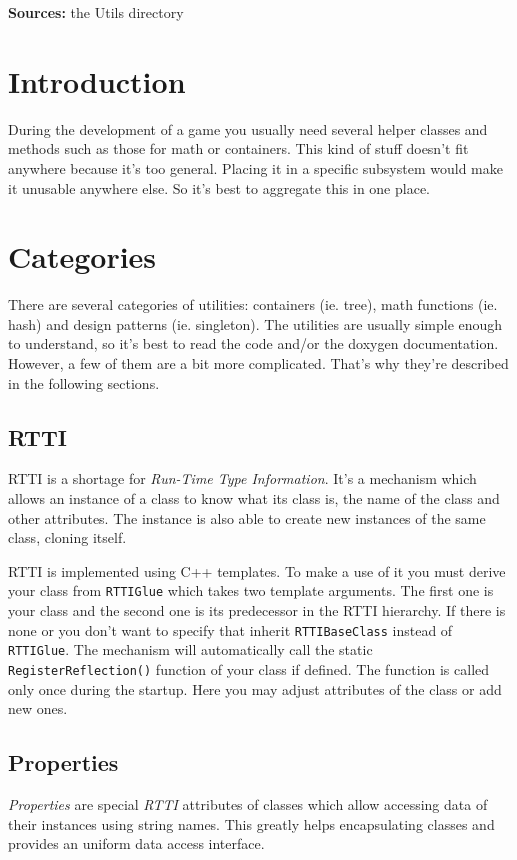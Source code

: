 \noindent\textbf{Sources:} the Utils directory


\section{Introduction}
During the development of a game you usually need several helper classes and methods such as those for math or containers. This kind of stuff doesn't fit anywhere because it's too general. Placing it in a specific subsystem would make it unusable anywhere else. So it's best to aggregate this in one place.



\section{Categories}
There are several categories of utilities: containers (ie. tree), math functions (ie. hash) and design patterns (ie. singleton). The utilities are usually simple enough to understand, so it's best to read the code and/or the doxygen documentation. However, a few of them are a bit more complicated. That's why they're described in the following sections.


\subsection{RTTI}
RTTI is a shortage for \emph{Run-Time Type Information}. It's a mechanism which allows an instance of a class to know what its class is, the name of the class and other attributes. The instance is also able to create new instances of the same class, cloning itself.

RTTI is implemented using C++ templates. To make a use of it you must derive your class from \verb'RTTIGlue' which takes two template arguments. The first one is your class and the second one is its predecessor in the RTTI hierarchy. If there is none or you don't want to specify that inherit \verb'RTTIBaseClass' instead of \verb'RTTIGlue'. The mechanism will automatically call the static \verb'RegisterReflection()' function of your class if defined. The function is called only once during the startup. Here you may adjust attributes of the class or add new ones.


\subsection{Properties}
\emph{Properties} are special \emph{RTTI} attributes of classes which allow accessing data of their instances using string names. This greatly helps encapsulating classes and provides an uniform data access interface.

